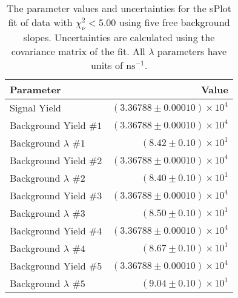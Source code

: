 
\begin{table}[h]
    \begin{center}
        \begin{tabular}{lr}\toprule
            Parameter & Value \\\midrule
            Signal Yield & $(3.36788 \pm 0.00010) \times 10^{4}$ \\
            Background Yield $\#1$ & $(3.36788 \pm 0.00010) \times 10^{4}$ \\
            Background $\lambda$ $\#1$ & $(8.42 \pm 0.10) \times 10^{1}$ \\
            Background Yield $\#2$ & $(3.36788 \pm 0.00010) \times 10^{4}$ \\
            Background $\lambda$ $\#2$ & $(8.40 \pm 0.10) \times 10^{1}$ \\
            Background Yield $\#3$ & $(3.36788 \pm 0.00010) \times 10^{4}$ \\
            Background $\lambda$ $\#3$ & $(8.50 \pm 0.10) \times 10^{1}$ \\
            Background Yield $\#4$ & $(3.36788 \pm 0.00010) \times 10^{4}$ \\
            Background $\lambda$ $\#4$ & $(8.67 \pm 0.10) \times 10^{1}$ \\
            Background Yield $\#5$ & $(3.36788 \pm 0.00010) \times 10^{4}$ \\
            Background $\lambda$ $\#5$ & $(9.04 \pm 0.10) \times 10^{1}$ \\\bottomrule
        \end{tabular}
        \caption{The parameter values and uncertainties for the sPlot fit of data with $\chi^2_\nu < 5.00$ using five free background slopes. Uncertainties are calculated using the covariance matrix of the fit. All $\lambda$ parameters have units of $\si{\nano\second}^{-1}$.}
    \end{center}
\end{table}
